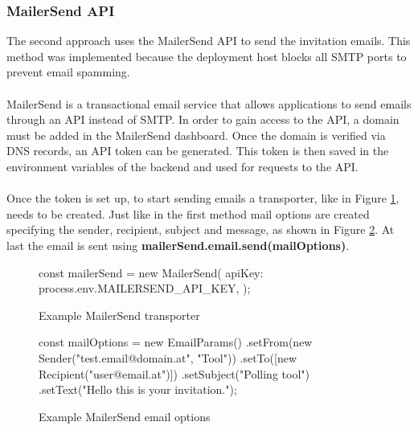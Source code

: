 \documentclass[a4paper,12pt]{report}
\begin{document}
\subsubsection{MailerSend API}
The second approach uses the MailerSend API to send the invitation emails. This method was implemented because the deployment host blocks all SMTP ports to prevent email spamming. \\\\
MailerSend is a transactional email service that allows applications to send emails through an API instead of SMTP. In order to gain access to the API, a domain must be added in the MailerSend dashboard. Once the domain is verified via DNS records, an API token can be generated. This token is then saved in the environment variables of the backend and used for requests to the API. \\\\
Once the token is set up, to start sending emails a transporter, like in Figure \ref{fig:example-mailersend-transporter-creation}, needs to be created. Just like in the first method mail options are created specifying the sender, recipient, subject and message, as shown in Figure \ref{fig:example-mail-options-mailersend}. At last the email is sent using \textbf{mailerSend.email.send(mailOptions)}.
\begin{figure}[H]
	\begin{code}
		const mailerSend = new MailerSend({
			apiKey: process.env.MAILERSEND_API_KEY,
		});
	\end{code}
	\caption{Example MailerSend transporter}
	\label{fig:example-mailersend-transporter-creation}
\end{figure}
\begin{figure}[H]
	\begin{code}
		const mailOptions = new EmailParams()
		.setFrom(new Sender("test.email@domain.at", "Tool"))
		.setTo([new Recipient("user@email.at")])
		.setSubject("Polling tool")
		.setText("Hello this is your invitation.");
	\end{code}
	\caption{Example MailerSend email options}
	\label{fig:example-mail-options-mailersend}
\end{figure}
\end{document}
